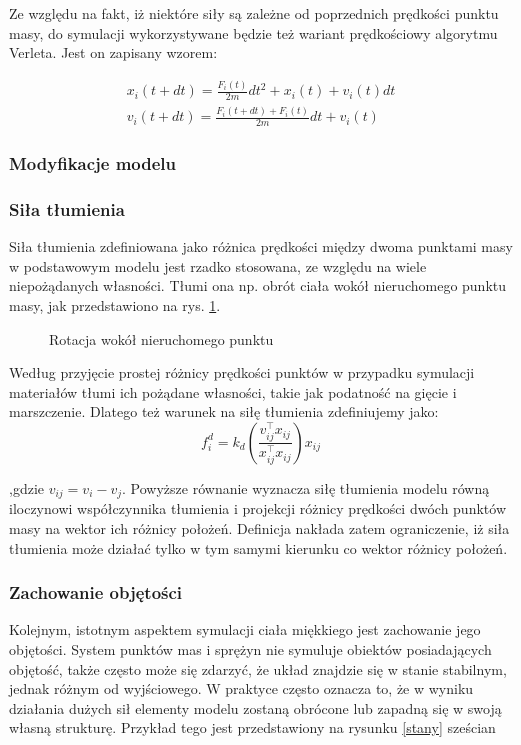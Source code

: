 Ze względu na fakt, iż niektóre siły są zależne od poprzednich prędkości punktu masy, do symulacji wykorzystywane będzie też wariant prędkościowy algorytmu Verleta. Jest on zapisany wzorem:

\begin{eqnarray}
x_i(t + dt) = \frac{F_i(t)}{2m} dt^2 + x_i(t) + v_i(t)dt \\
v_i(t + dt) = \frac{F_i(t + dt) + F_i(t)}{2m}dt + v_i(t)
\end{eqnarray}

%
%
\subsubsection{Modyfikacje modelu}

\subsubsection{Siła tłumienia}
Siła tłumienia zdefiniowana jako różnica prędkości między dwoma punktami masy w podstawowym modelu jest rzadko stosowana, ze względu na wiele niepożądanych własności. Tłumi ona np. obrót ciała wokół nieruchomego punktu masy, jak przedstawiono na rys. \ref{tlumienie}.

\begin{figure}[ht]
\centering

\caption{Rotacja wokół nieruchomego punktu}
\label{tlumienie}
\end{figure}

Według \cite{pbdo} przyjęcie prostej różnicy prędkości punktów w przypadku symulacji materiałów tłumi ich pożądane własności, takie jak podatność na gięcie i marszczenie. Dlatego też warunek na siłę tłumienia zdefiniujemy jako:
\begin{equation}
f^{d}_i = k_d (\frac{v_{ij}^\intercal x_{ij}}{x_{ij}^\intercal x_{ij}}) x_{ij}
\end{equation}

,gdzie $v_{ij} = v_i - v_j$. Powyższe równanie wyznacza siłę tłumienia modelu równą iloczynowi współczynnika tłumienia i projekcji różnicy prędkości dwóch punktów masy na wektor ich różnicy położeń. Definicja nakłada zatem ograniczenie, iż siła tłumienia może działać tylko w tym samymi kierunku co wektor różnicy położeń.

\subsubsection{Zachowanie objętości}
Kolejnym, istotnym aspektem symulacji ciała miękkiego jest zachowanie jego objętości. System punktów mas i sprężyn nie symuluje obiektów posiadających objętość, także często może się zdarzyć, że układ znajdzie się w stanie stabilnym, jednak różnym od wyjściowego. W praktyce często oznacza to, że w wyniku działania dużych sił elementy modelu zostaną obrócone lub zapadną się w swoją własną strukturę. Przykład tego jest przedstawiony na rysunku \ref{stany} sześcian 

